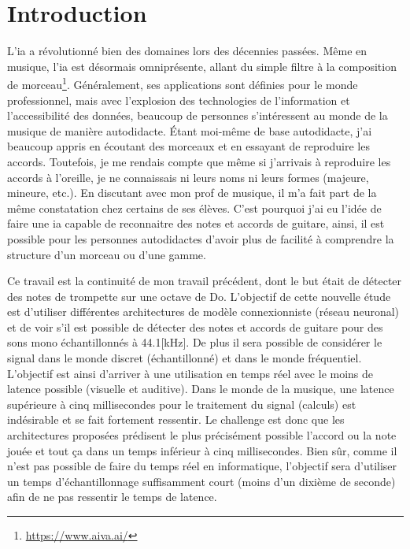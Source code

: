 \chapter*{Introduction}

L’\gls{ia} a révolutionné bien des domaines lors des décennies passées. Même en musique, l’\gls{ia} est désormais omniprésente, allant du simple filtre à la composition de morceau\footnote{\url{https://www.aiva.ai/}}. Généralement, ses applications sont définies pour le monde professionnel, mais avec l'explosion des technologies de l'information et l'accessibilité des données, beaucoup de personnes s'intéressent au monde de la musique de manière autodidacte. Étant moi-même de base autodidacte, j'ai beaucoup appris en écoutant des morceaux et en essayant de reproduire les accords. Toutefois, je me rendais compte que même si j'arrivais à reproduire les accords à l'oreille, je ne connaissais ni leurs noms ni leurs formes (majeure, mineure, etc.). En discutant avec mon prof de musique, il m'a fait part de la même constatation chez certains de ses élèves. C'est pourquoi j'ai eu l'idée de faire une \gls{ia} capable de reconnaitre des notes et accords de guitare, ainsi, il est possible pour les personnes autodidactes d'avoir plus de facilité à comprendre la structure d'un morceau ou d'une gamme.

Ce travail est la continuité de mon travail précédent, dont le but était de détecter des notes de trompette sur une octave de Do. L'objectif de cette nouvelle étude est d'utiliser différentes architectures de modèle connexionniste (réseau neuronal) et de voir s'il est possible de détecter des notes et accords de guitare pour des sons mono échantillonnés à 44.1[kHz]. De plus il sera possible de considérer le signal dans le monde discret (échantillonné) et dans le monde fréquentiel. L’objectif est ainsi d’arriver à une utilisation en temps réel avec le moins de latence possible (visuelle et auditive). Dans le monde de la musique, une latence supérieure à cinq millisecondes pour le traitement du signal (calculs) est indésirable et se fait fortement ressentir. Le challenge est donc que les architectures proposées prédisent le plus précisément possible l'accord ou la note jouée et tout ça dans un temps inférieur à cinq millisecondes. Bien sûr, comme il n'est pas possible de faire du temps réel en informatique, l'objectif sera d'utiliser un temps d'échantillonnage suffisamment court (moins d'un dixième de seconde) afin de ne pas ressentir le temps de latence.

